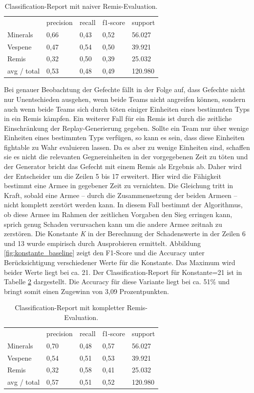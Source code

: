 \begin{table}
\centering
\caption{Classification-Report mit naiver Remis-Evaluation.}
\begin{tabular}{@{}lllll@{}}
\hline
& precision & recall & f1-score & support\\
Minerals & 0,66 & 0,43 & 0,52 & 56.027\\
Vespene & 0,47 & 0,54 & 0,50 & 39.921\\
Remis & 0,32 & 0,50 & 0,39 & 25.032\\
 avg / total & 0,53 & 0,48 & 0,49 & 120.980\\
\hline
\end{tabular}
\label{tb:classificationmitremisnaiv}
\end{table}

Bei genauer Beobachtung der Gefechte fällt in der Folge auf, dass Gefechte nicht nur Unentschieden ausgehen, wenn beide Teams nicht angreifen können, sondern auch wenn beide Teams sich durch töten einiger Einheiten eines bestimmten Typs in ein Remis kämpfen. Ein weiterer Fall für ein Remis ist durch die zeitliche Einschränkung der Replay-Generierung gegeben. Sollte ein Team nur über wenige Einheiten eines bestimmten Typs verfügen, so kann es sein, dass diese Einheiten fightable zu Wahr evaluieren lassen. Da es aber zu wenige Einheiten sind, schaffen sie es nicht die relevanten Gegnereinheiten in der vorgegebenen Zeit zu töten und der Generator bricht das Gefecht mit einem Remis als Ergebnis ab. Daher wird der Entscheider um die Zeilen 5 bis 17 erweitert. Hier wird die Fähigkeit bestimmt eine Armee in gegebener Zeit zu vernichten. Die Gleichung tritt in Kraft, sobald eine Armee -- durch die Zusammensetzung der beiden Armeen -- nicht komplett zerstört werden kann. In diesem Fall bestimmt der Algorithmus, ob diese Armee im Rahmen der zeitlichen Vorgaben den Sieg erringen kann, sprich genug Schaden verursachen kann um die andere Armee zeitnah zu zerstören. Die Konstante \textit{K} in der Berechnung der Schadenswerte in der Zeilen 6 und 13 wurde empirisch durch Ausprobieren ermittelt. Abbildung \ref{fig:konstante_baseline} zeigt den F1-Score und die Accuracy unter Berücksichtigung verschiedener Werte für die Konstante. Das Maximum wird beider Werte liegt bei ca. 21. Der Classification-Report für Konstante=21 ist in Tabelle \ref{tb:classificationcomplete} dargestellt. Die Accuracy für diese Variante liegt bei ca. 51\% und bringt somit einen Zugewinn von 3,09 Prozentpunkten.

\begin{table}
\centering
\caption{Classification-Report mit kompletter Remis-Evaluation.}
\begin{tabular}{@{}lllll@{}}
\hline
& precision & recall & f1-score & support\\
Minerals & 0,70 & 0,48 & 0,57 & 56.027\\
Vespene & 0,54 & 0,51 & 0,53 & 39.921\\
Remis & 0,32 & 0,58 & 0,41 & 25.032\\
 avg / total & 0,57 & 0,51 & 0,52 & 120.980\\
\hline
\end{tabular}
\label{tb:classificationcomplete}
\end{table}

